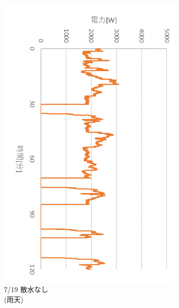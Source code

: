 \documentclass[a4j,fleqn,dvipdfmx,uplatex]{jsarticle}
\begin{document}
\begin{figure}[htb]
\begin{subfigure}[t]{0.32\linewidth}
    \includegraphics[width=\linewidth]{img/0719_power.png}
    \caption{7/19 散水なし\\(雨天)}\label{fig:c}
  \end{subfigure}\\
  \begin{subfigure}[t]{0.32\linewidth}
    \centering

\end{subfigure}
\end{figure}
\end{document}
